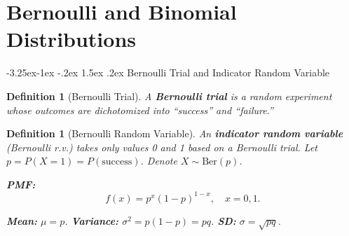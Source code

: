 \documentclass{article}
\makeatletter
\newtheorem{definition}[theorem]{Definition}
\theoremstyle{remark}
\newlength{\subsecindent}
\renewcommand\subsection{\@startsection{subsection}{2}{\subsecindent}%
  {-3.25ex\@plus -1ex \@minus -.2ex}%
  {1.5ex \@plus .2ex}%
  {\normalfont\large\bfseries}}
\newenvironment{sub}{%
  \begin{list}{}{%
    \setlength{\leftmargin}{4em}%
    \setlength{\rightmargin}{0pt}%
    \setlength{\topsep}{0pt}%
    \setlength{\partopsep}{0pt}%
    \setlength{\parsep}{\parskip}%
    \setlength{\itemsep}{\parskip}%
  }\item\relax
}{\end{list}}
\makeatother
\begin{document}
\section{Bernoulli and Binomial Distributions}
\label{sec:det-binom}

\subsection{Bernoulli Trial and Indicator Random Variable}
\begin{sub}

\begin{definition}[Bernoulli Trial]
  A \textbf{Bernoulli trial} is a random experiment whose outcomes are
  dichotomized into ``success'' and ``failure.''
\end{definition}

\begin{definition}[Bernoulli Random Variable]
  An \textbf{indicator random variable} (Bernoulli r.v.) takes only values 0
  and 1 based on a Bernoulli trial.
  Let $p = P(X = 1) = P(\text{success})$. Denote $X \sim \text{Ber}(p)$.

  \textbf{PMF:}
  \begin{equation}
    f(x) = p^x (1-p)^{1-x}, \quad x = 0, 1.
    \label{eq:ber-pmf}
  \end{equation}

  \textbf{Mean:} $\mu = p$. \quad
  \textbf{Variance:} $\sigma^2 = p(1-p) = pq$. \quad
  \textbf{SD:} $\sigma = \sqrt{pq}$.
\end{definition}

\end{sub}
\end{document}
